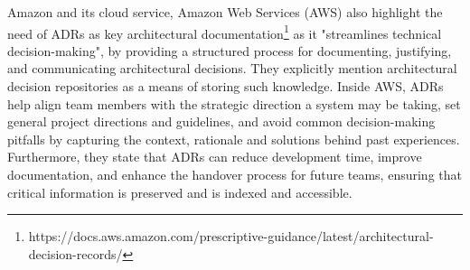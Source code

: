         Amazon and its cloud service, Amazon Web Services (AWS) also highlight the need of ADRs as key architectural documentation\footnote{https://docs.aws.amazon.com/prescriptive-guidance/latest/architectural-decision-records/} as it "streamlines technical decision-making", by providing a structured process for documenting, justifying, and communicating architectural decisions. They explicitly mention architectural decision repositories as a means of storing such knowledge. Inside AWS, ADRs help align team members with the strategic direction a system may be taking, set general project directions and guidelines, and avoid common decision-making pitfalls by capturing the context, rationale and solutions behind past experiences. Furthermore, they state that ADRs can reduce development time, improve documentation, and enhance the handover process for future teams, ensuring that critical information is preserved and is indexed and accessible. 